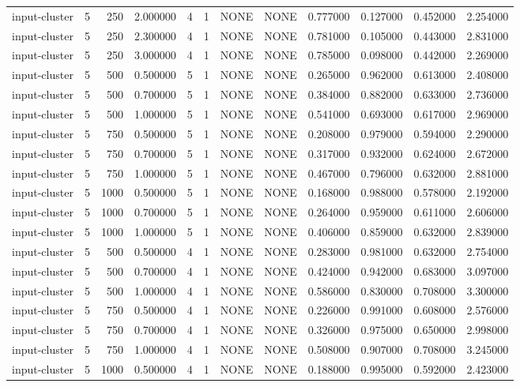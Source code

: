 \begin{tabular}{lrrrllllrrrr}
input-cluster & 5 & 250 & 2.000000 & 4 & 1 & NONE & NONE & 0.777000 & 0.127000 & 0.452000 & 2.254000 \\
input-cluster & 5 & 250 & 2.300000 & 4 & 1 & NONE & NONE & 0.781000 & 0.105000 & 0.443000 & 2.831000 \\
input-cluster & 5 & 250 & 3.000000 & 4 & 1 & NONE & NONE & 0.785000 & 0.098000 & 0.442000 & 2.269000 \\
input-cluster & 5 & 500 & 0.500000 & 5 & 1 & NONE & NONE & 0.265000 & 0.962000 & 0.613000 & 2.408000 \\
input-cluster & 5 & 500 & 0.700000 & 5 & 1 & NONE & NONE & 0.384000 & 0.882000 & 0.633000 & 2.736000 \\
input-cluster & 5 & 500 & 1.000000 & 5 & 1 & NONE & NONE & 0.541000 & 0.693000 & 0.617000 & 2.969000 \\
input-cluster & 5 & 750 & 0.500000 & 5 & 1 & NONE & NONE & 0.208000 & 0.979000 & 0.594000 & 2.290000 \\
input-cluster & 5 & 750 & 0.700000 & 5 & 1 & NONE & NONE & 0.317000 & 0.932000 & 0.624000 & 2.672000 \\
input-cluster & 5 & 750 & 1.000000 & 5 & 1 & NONE & NONE & 0.467000 & 0.796000 & 0.632000 & 2.881000 \\
input-cluster & 5 & 1000 & 0.500000 & 5 & 1 & NONE & NONE & 0.168000 & 0.988000 & 0.578000 & 2.192000 \\
input-cluster & 5 & 1000 & 0.700000 & 5 & 1 & NONE & NONE & 0.264000 & 0.959000 & 0.611000 & 2.606000 \\
input-cluster & 5 & 1000 & 1.000000 & 5 & 1 & NONE & NONE & 0.406000 & 0.859000 & 0.632000 & 2.839000 \\
input-cluster & 5 & 500 & 0.500000 & 4 & 1 & NONE & NONE & 0.283000 & 0.981000 & 0.632000 & 2.754000 \\
input-cluster & 5 & 500 & 0.700000 & 4 & 1 & NONE & NONE & 0.424000 & 0.942000 & 0.683000 & 3.097000 \\
input-cluster & 5 & 500 & 1.000000 & 4 & 1 & NONE & NONE & 0.586000 & 0.830000 & 0.708000 & 3.300000 \\
input-cluster & 5 & 750 & 0.500000 & 4 & 1 & NONE & NONE & 0.226000 & 0.991000 & 0.608000 & 2.576000 \\
input-cluster & 5 & 750 & 0.700000 & 4 & 1 & NONE & NONE & 0.326000 & 0.975000 & 0.650000 & 2.998000 \\
input-cluster & 5 & 750 & 1.000000 & 4 & 1 & NONE & NONE & 0.508000 & 0.907000 & 0.708000 & 3.245000 \\
input-cluster & 5 & 1000 & 0.500000 & 4 & 1 & NONE & NONE & 0.188000 & 0.995000 & 0.592000 & 2.423000 \\

\end{tabular}
